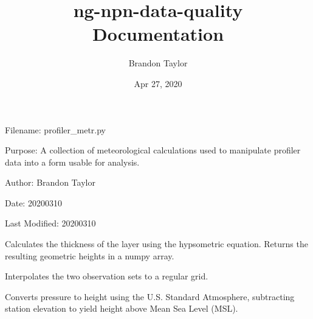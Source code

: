 \documentclass[letterpaper,10pt,english]{sphinxmanual}
\title{ng-npn-data-quality Documentation}
\date{Apr 27, 2020}
\author{Brandon Taylor}
\begin{document}
\pagestyle{empty}
\sphinxmaketitle
\pagestyle{plain}
\sphinxtableofcontents
\pagestyle{normal}
\label{\detokenize{index::doc}}

\label{\detokenize{index:module-profiler_metr}}
Filename: profiler\_metr.py

Purpose: A collection of meteorological calculations used to 
manipulate profiler data into a form usable for analysis.

Author: Brandon Taylor

Date: 20200310

Last Modified: 20200310

\begin{fulllineitems}
\label{\detokenize{index:profiler_metr.hypsometric}}
Calculates the thickness of the layer using the hypsometric equation.
Returns the resulting geometric heights in a numpy array.

\end{fulllineitems}


\begin{fulllineitems}
\label{\detokenize{index:profiler_metr.interpolate_uv}}
Interpolates the two observation sets to a regular
grid.

\end{fulllineitems}


\begin{fulllineitems}
\label{\detokenize{index:profiler_metr.pressure_to_height}}
Converts pressure to height using the U.S. Standard Atmosphere,
subtracting station elevation to yield height above Mean Sea Level (MSL).

\end{fulllineitems}
\end{document}
